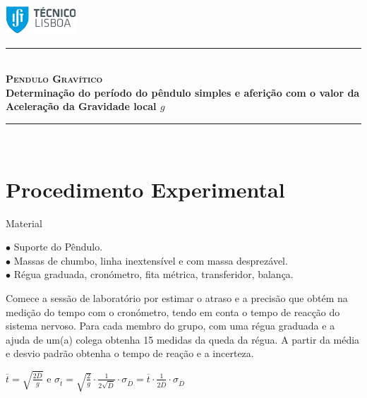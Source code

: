 \documentclass[a4paper,12pt]{article}      %
\author{Prof. Bernardo B. Carvalho}
\date{ Setembro 2017}
\newcommand{\HRule}{\rule{\linewidth}{0.5mm}}
\begin{document}
 


\includegraphics[width=0.2\textwidth]{../../logo-ist}%
	
	\HRule \\[0.5cm]
	{ \huge   \bfseries \textsc{ Pendulo Gravítico } }\\[0.4cm]
	{ \large \bfseries Determinação do período do pêndulo simples e aferição com o valor da Aceleração da Gravidade local $g$  }\\
	\HRule \\%
	

\section*{\sf Procedimento Experimental}
{ \large Material }
 \begin{flushleft}
	 $\bullet$ Suporte do Pêndulo. \\
	 $\bullet$ Massas de chumbo, linha inextensível e com massa desprezável. \\
	 $\bullet$ Régua graduada, cronómetro, fita métrica, transferidor, balança.
\end{flushleft} 

Comece a sessão de laboratório por estimar o atraso e a precisão que obtém na medição do tempo com o cronómetro, tendo em conta 
o tempo de reacção do sistema nervoso. 
Para cada membro do grupo, com  uma régua graduada e a ajuda de um(a) colega obtenha 15 medidas da queda da régua. A partir da média e desvio padrão obtenha o  tempo de reação  e a incerteza. 

$\overline{t}=\sqrt{\frac{2 \overline{D}}{g}}$ e   
$\sigma_{\overline{t}}=\sqrt{\frac{2 }{g}} \cdot \frac{1}{2\sqrt{\overline{D}}} \cdot \sigma_{\overline{D}}  
= \overline{t} \cdot \frac{1}{2\overline{D}} \cdot \sigma_{\overline{D}} $ 
\end{document}
